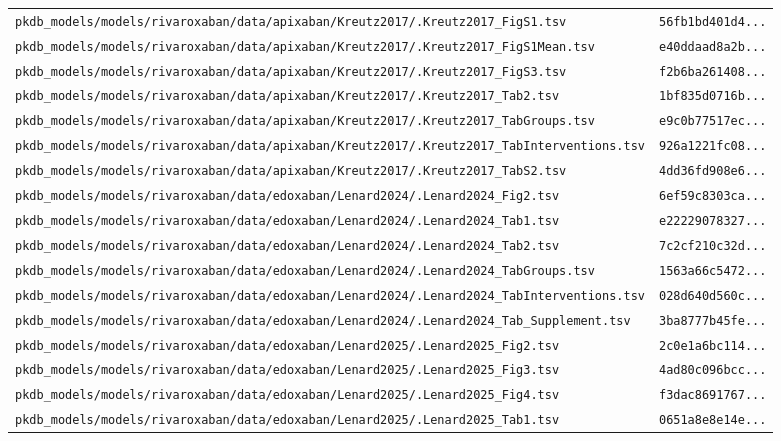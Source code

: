\documentclass{article}
\begin{document}
\begin{longtable}{ll}
\texttt{pkdb\_models/models/rivaroxaban/data/apixaban/Kreutz2017/.Kreutz2017\_FigS1.tsv} & \texttt{56fb1bd401d4...} \\
\texttt{pkdb\_models/models/rivaroxaban/data/apixaban/Kreutz2017/.Kreutz2017\_FigS1Mean.tsv} & \texttt{e40ddaad8a2b...} \\
\texttt{pkdb\_models/models/rivaroxaban/data/apixaban/Kreutz2017/.Kreutz2017\_FigS3.tsv} & \texttt{f2b6ba261408...} \\
\texttt{pkdb\_models/models/rivaroxaban/data/apixaban/Kreutz2017/.Kreutz2017\_Tab2.tsv} & \texttt{1bf835d0716b...} \\
\texttt{pkdb\_models/models/rivaroxaban/data/apixaban/Kreutz2017/.Kreutz2017\_TabGroups.tsv} & \texttt{e9c0b77517ec...} \\
\texttt{pkdb\_models/models/rivaroxaban/data/apixaban/Kreutz2017/.Kreutz2017\_TabInterventions.tsv} & \texttt{926a1221fc08...} \\
\texttt{pkdb\_models/models/rivaroxaban/data/apixaban/Kreutz2017/.Kreutz2017\_TabS2.tsv} & \texttt{4dd36fd908e6...} \\
\texttt{pkdb\_models/models/rivaroxaban/data/edoxaban/Lenard2024/.Lenard2024\_Fig2.tsv} & \texttt{6ef59c8303ca...} \\
\texttt{pkdb\_models/models/rivaroxaban/data/edoxaban/Lenard2024/.Lenard2024\_Tab1.tsv} & \texttt{e22229078327...} \\
\texttt{pkdb\_models/models/rivaroxaban/data/edoxaban/Lenard2024/.Lenard2024\_Tab2.tsv} & \texttt{7c2cf210c32d...} \\
\texttt{pkdb\_models/models/rivaroxaban/data/edoxaban/Lenard2024/.Lenard2024\_TabGroups.tsv} & \texttt{1563a66c5472...} \\
\texttt{pkdb\_models/models/rivaroxaban/data/edoxaban/Lenard2024/.Lenard2024\_TabInterventions.tsv} & \texttt{028d640d560c...} \\
\texttt{pkdb\_models/models/rivaroxaban/data/edoxaban/Lenard2024/.Lenard2024\_Tab\_Supplement.tsv} & \texttt{3ba8777b45fe...} \\
\texttt{pkdb\_models/models/rivaroxaban/data/edoxaban/Lenard2025/.Lenard2025\_Fig2.tsv} & \texttt{2c0e1a6bc114...} \\
\texttt{pkdb\_models/models/rivaroxaban/data/edoxaban/Lenard2025/.Lenard2025\_Fig3.tsv} & \texttt{4ad80c096bcc...} \\
\texttt{pkdb\_models/models/rivaroxaban/data/edoxaban/Lenard2025/.Lenard2025\_Fig4.tsv} & \texttt{f3dac8691767...} \\
\texttt{pkdb\_models/models/rivaroxaban/data/edoxaban/Lenard2025/.Lenard2025\_Tab1.tsv} & \texttt{0651a8e8e14e...} \\

\end{longtable}
\end{document}
